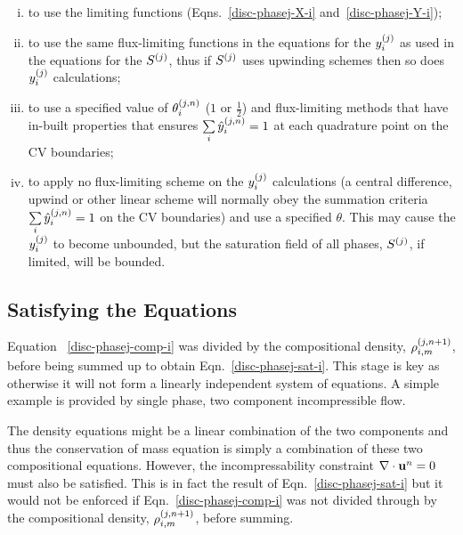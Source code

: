 \begin{enumerate}[i)]
   \item to use the limiting functions (Eqns.~\ref{disc-phasej-X-i} and~\ref{disc-phasej-Y-i}); 
   \item to use the same flux-limiting functions in the equations for the $\mfr[y]{i}{j}$ as used in the equations for the $\mfr[S]{}{j}$, thus if $\mfr[S]{}{j}$ uses upwinding schemes then so does $\mfr[y]{i}{j}$ calculations;
   \item to use a specified value of $\mfr[\theta]{i}{j,n}$ (\eg $1$ or $\frac{1}{2}$) and flux-limiting methods that have in-built properties that ensures $\summation_{i} \mfr[\hat{y}]{i}{j,n}=1$ at each quadrature point on the CV boundaries; 
   \item to apply no flux-limiting scheme on the $\mfr[y]{i}{j}$ calculations (a central difference, upwind or other linear scheme will normally obey the summation criteria $\summation_{i} \mfr[\hat{y}]{i}{j,n}=1$ on the CV boundaries) and use a specified $\theta$. This may cause the $\mfr[y]{i}{j}$ to become unbounded, but the saturation field of all phases, $\mfr[S]{}{j}$, if limited, will be bounded. 
\end{enumerate}



\subsection{Satisfying the Equations} \label{Chapter:CompositionalModel:Section:SatisfyingEqns}
Equation ~\ref{disc-phasej-comp-i} was divided by the compositional density, $\mfr[\rho]{i,m}{j,n+1}$, before being summed up to obtain Eqn.~\ref{disc-phasej-sat-i}. This stage is key as otherwise it will not form a linearly independent system of equations. A simple example is provided by single phase, two component incompressible flow. 

The density equations might be a linear combination of the two components and thus the conservation of mass equation is simply a combination of these two compositional equations. However, the incompressability constraint $\nabla \cdot {\bf u}^n=0$ must also be satisfied. This is in fact the result of Eqn.~\ref{disc-phasej-sat-i} but it would not be enforced if Eqn.~\ref{disc-phasej-comp-i} was not divided through by the compositional density, $\mfr[\rho]{i,m}{j,n+1}$, before summing. 


